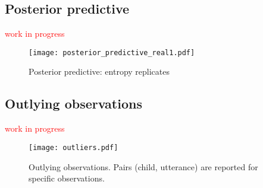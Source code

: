 \subsection{Posterior predictive} \label{sS:results_posterior}
%
\textcolor{red}{work in progress}
%
\begin{figure}[!h]
	\centering
	\texttt{[image: posterior\_predictive\_real1.pdf]}
	\caption[Posterior predictive: entropy replicates]{Posterior predictive: entropy replicates}
	\label{fig:predictive1}
\end{figure}
%
%
\subsection{Outlying observations} \label{sS:results_outliers}
%
\textcolor{red}{work in progress}
%
\begin{figure}[!h]
	\centering
	\texttt{[image: outliers.pdf]}
	\caption[Outlying observations]{Outlying observations. Pairs (child, utterance) are reported for specific observations.}
	\label{fig:outliers}
\end{figure}
%
%